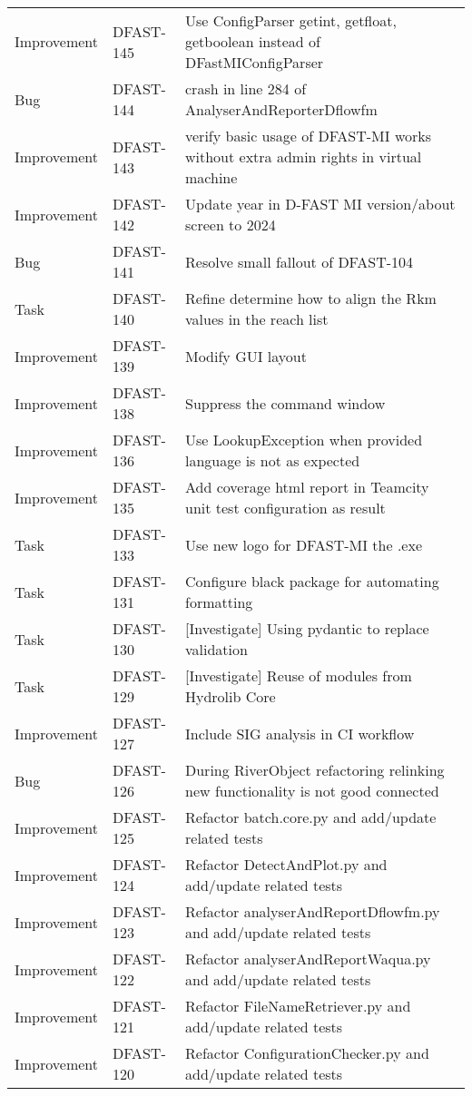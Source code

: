 \documentclass{deltares_memo}
\begin{document}
\begin{longtable}{l|l|p{8cm}}
Improvement & DFAST-145 & Use ConfigParser getint, getfloat, getboolean instead of DFastMIConfigParser \\
Bug & DFAST-144 & crash in line 284 of AnalyserAndReporterDflowfm \\
Improvement & DFAST-143 & verify basic usage of DFAST-MI works without extra admin rights in virtual machine \\
Improvement & DFAST-142 & Update year in D-FAST MI version/about screen to 2024 \\
Bug & DFAST-141 & Resolve small fallout of DFAST-104 \\
Task & DFAST-140 & Refine determine how to align the Rkm values in the reach list \\
Improvement & DFAST-139 & Modify GUI layout \\
Improvement & DFAST-138 & Suppress the command window \\
Improvement & DFAST-136 & Use LookupException when provided language is not as expected \\
Improvement & DFAST-135 & Add coverage html report in Teamcity unit test configuration as result \\
Task & DFAST-133 & Use new logo for DFAST-MI the .exe \\
Task & DFAST-131 & Configure black package for automating formatting \\
Task & DFAST-130 & [Investigate] Using pydantic to replace validation \\
Task & DFAST-129 & [Investigate] Reuse of modules from Hydrolib Core \\
Improvement & DFAST-127 & Include SIG analysis in CI workflow \\
Bug & DFAST-126 & During RiverObject refactoring relinking new functionality is not good connected \\
Improvement & DFAST-125 & Refactor batch.core.py and add/update related tests \\
Improvement & DFAST-124 & Refactor DetectAndPlot.py and add/update related tests \\
Improvement & DFAST-123 & Refactor analyserAndReportDflowfm.py and add/update related tests \\
Improvement & DFAST-122 & Refactor analyserAndReportWaqua.py and add/update related tests \\
Improvement & DFAST-121 & Refactor FileNameRetriever.py and add/update related tests \\
Improvement & DFAST-120 & Refactor ConfigurationChecker.py and add/update related tests \\

\end{longtable}
\end{document}
